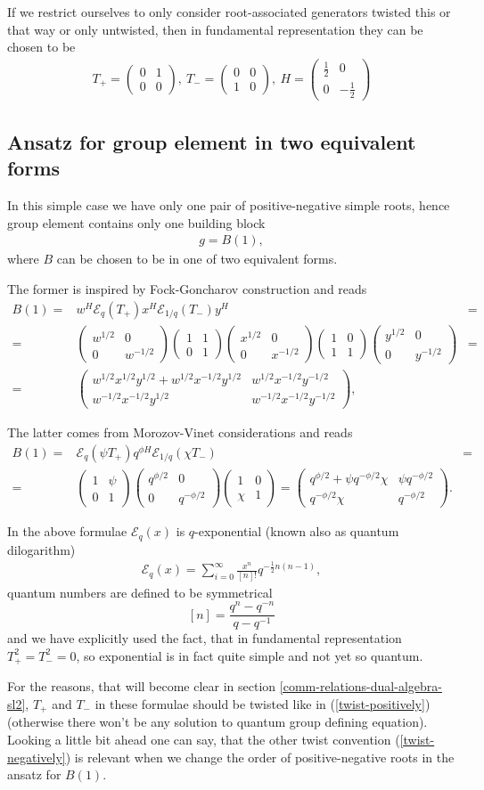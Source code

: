 \documentclass{article}
\newcommand{\lb}{\left (}
\newcommand{\rb}{\right )}
\newcommand{\be}{\begin{eqnarray}}
\newcommand{\ee}{\end{eqnarray}}
\newcommand {\?}{\textit{???}}
\newcommand{\me}[0]{\mathcal{E}}
\newcommand{\matd}[4]{\lb \begin{array}{cc}
#1 & #2 \\ #3 & #4
\end{array} \rb}
\newcommand{\delabel}[1]{(\ref{#1})}
\newcommand{\Honed}[1]{\lb \begin{array}{ccc}
#1^{1/2} & 0 \\ 0 & #1^{-1/2}
\end{array} \rb}
\newcommand{\Eoned}[1]{\lb \begin{array}{cc}
1 & #1 \\ 0 & 1
\end{array} \rb}
\newcommand{\Foned}[1]{\lb \begin{array}{cc}
1 & 0 \\ #1 & 1
\end{array} \rb}
\begin{document}
If we restrict ourselves to only consider root-associated generators twisted this or that way or only untwisted,
then in fundamental representation they can be chosen to be
\be
T_+ = \matd{0}{1}{0}{0},\ T_- = \matd{0}{0}{1}{0},\ H = \matd{\frac{1}{2}}{0}{0}{-\frac{1}{2}}
\ee

\subsection{Ansatz for group element in two equivalent forms}
In this simple case we have only one pair of positive-negative simple roots, hence group
element contains only one building block
\be
\label{quantum-group-element-sl2}
g = B(1),
\ee
where $B$ can be chosen to be in one of two equivalent forms.

The former is inspired by Fock-Goncharov construction and reads
\be
\label{building-block-sl2-fg}
B(1) = & w^H \me_q \lb T_+\rb x^H \me_{1/q} \lb T_- \rb y^H & = \\
= & \Honed{w} \Eoned{1} \Honed{x} \Foned{1} \Honed{y} & = \nonumber \\
= & \matd{w^{1/2}x^{1/2}y^{1/2} + w^{1/2}x^{-1/2}y^{1/2}}{w^{1/2}x^{-1/2}y^{-1/2}}
{w^{-1/2}x^{-1/2}y^{1/2}}{w^{-1/2}x^{-1/2}y^{-1/2}} \nonumber,
\ee

The latter comes from Morozov-Vinet considerations and reads
\be
\label{building-block-sl2-mv}
B(1) = & \me_q \lb \psi T_+ \rb q^{\phi H} \me_{1/q} \lb \chi T_- \rb & = \\
= & \Eoned{\psi} \matd{q^{\phi/2}}{0}{0}{q^{-\phi/2}} \Foned{\chi} = \matd{q^{\phi/2} + \psi q^{-\phi/2}\chi}{\psi q^{-\phi/2}}{q^{-\phi/2}\chi}{q^{-\phi/2}} \nonumber.
\ee

In the above formulae $\me_q(x)$ is $q$-exponential (known also as quantum dilogarithm)
\be
\me_q(x) = \sum_{i = 0}^\infty \frac{x^n}{[n]!} q^{-\frac{1}{2}n(n-1)},
\ee
quantum numbers are defined to be symmetrical
$$[n] = \frac{q^n - q^{-n}}{q - q^{-1}}$$
and we have explicitly used the fact, that in fundamental representation $T_+^2 = T_-^2 = 0$,
so exponential is in fact quite simple and not yet so quantum.

For the reasons, that will become clear in section \ref{comm-relations-dual-algebra-sl2},
$T_+$ and $T_-$ in these formulae should be twisted like in \delabel{twist-positively}
(otherwise there won't be any solution to quantum group defining equation).
Looking a little bit ahead one can say, that the other twist convention \delabel{twist-negatively}
is relevant when we change the order of positive-negative roots in the ansatz for $B(1)$.
\end{document}
